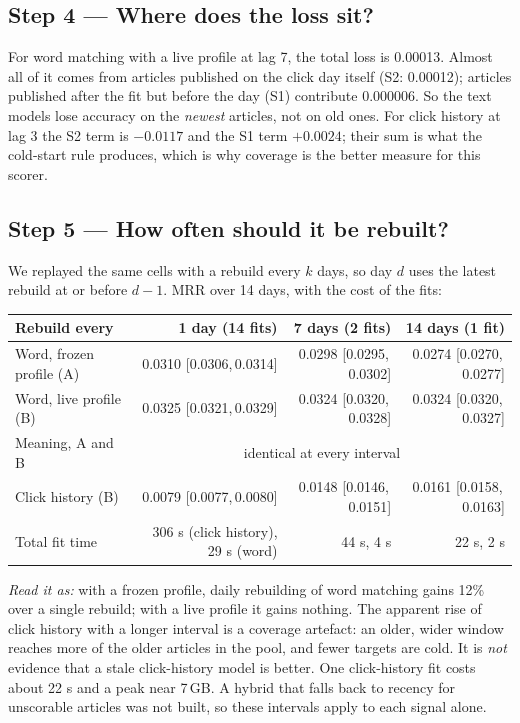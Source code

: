 \documentclass[11pt,a4paper]{article}
\newcommand{\ci}[2]{[#1,\,#2]}
\begin{document}
\subsection{Step 4 --- Where does the loss sit?}
For word matching with a live profile at lag 7, the total loss is 0.00013. Almost all of it comes from articles published on the click day itself (S2: 0.00012); articles published after the fit but before the day (S1) contribute 0.000006. So the text models lose accuracy on the \emph{newest} articles, not on old ones. For click history at lag 3 the S2 term is $-0.0117$ and the S1 term $+0.0024$; their sum is what the cold-start rule produces, which is why coverage is the better measure for this scorer.

\subsection{Step 5 --- How often should it be rebuilt?}
We replayed the same cells with a rebuild every $k$ days, so day $d$ uses the latest rebuild at or before $d-1$. MRR over 14 days, with the cost of the fits:
\begin{center}\small
\begin{tabular}{@{}lrrr@{}}
\toprule
Rebuild every & 1 day (14 fits) & 7 days (2 fits) & 14 days (1 fit)\\
\midrule
Word, frozen profile (A) & \cellcolor{green!12}0.0310 \ci{0.0306}{0.0314} & 0.0298 \ci{0.0295}{0.0302} & 0.0274 \ci{0.0270}{0.0277}\\
Word, live profile (B) & 0.0325 \ci{0.0321}{0.0329} & 0.0324 \ci{0.0320}{0.0328} & 0.0324 \ci{0.0320}{0.0327}\\
Meaning, A and B & \multicolumn{3}{c}{identical at every interval}\\
Click history (B) & 0.0079 \ci{0.0077}{0.0080} & 0.0148 \ci{0.0146}{0.0151} & 0.0161 \ci{0.0158}{0.0163}\\
Total fit time & 306 s (click history), 29 s (word) & 44 s, 4 s & 22 s, 2 s\\
\bottomrule
\end{tabular}
\end{center}
\textit{Read it as:} with a frozen profile, daily rebuilding of word matching gains 12\% over a single rebuild; with a live profile it gains nothing. The apparent rise of click history with a longer interval is a coverage artefact: an older, wider window reaches more of the older articles in the pool, and fewer targets are cold. It is \emph{not} evidence that a stale click-history model is better. One click-history fit costs about 22 s and a peak near 7\,GB. A hybrid that falls back to recency for unscorable articles was not built, so these intervals apply to each signal alone.
\end{document}
